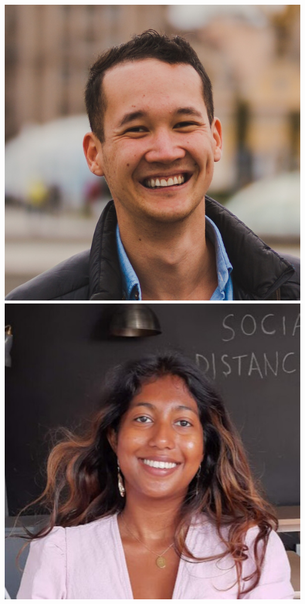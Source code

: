 \documentclass[aspectratio=169]{beamer}
\begin{document}
\begin{frame}
{        \includegraphics[width=0.10\textheight]{figures/students/kilian_scheutwinkel.jpg}%
        \includegraphics[width=0.10\textheight]{figures/students/metha_prathaban.jpg}%
}
\end{frame}
\end{document}
